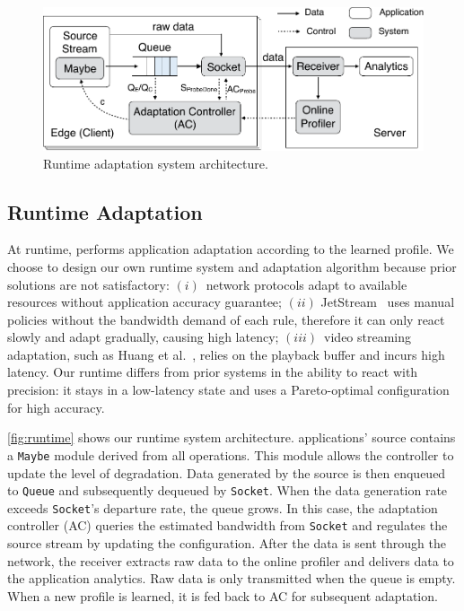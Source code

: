 \begin{figure}
  \centering
  \includegraphics[width=\linewidth]{figures/runtime-adaptation.pdf}
  \caption{Runtime adaptation system architecture.}
  \label{fig:runtime}
\end{figure}

\subsection{Runtime Adaptation}
\label{sec:runtime}

At runtime, \sysname{} performs application adaptation according to the learned
profile. We choose to design our own runtime system and adaptation algorithm
because prior solutions are not satisfactory: $(i)$~network protocols adapt to
available resources without application accuracy guarantee; $(ii)$
JetStream~\cite{rabkin2014aggregation} uses manual policies without the
bandwidth demand of each rule, therefore it can only react slowly and adapt
gradually, causing high latency; $(iii)$~video streaming adaptation, such as
Huang et al.~\cite{huang2014buffer}, relies on the playback buffer and incurs
high latency. Our runtime differs from prior systems in the ability to react
with precision: it stays in a low-latency state and uses a Pareto-optimal
configuration for high accuracy.

\autoref{fig:runtime} shows our runtime system architecture. \sysname{}
applications' source contains a \texttt{Maybe} module derived from all \maybe{}
operations. This module allows the controller to update the level of
degradation. Data generated by the source is then enqueued to \texttt{Queue} and
subsequently dequeued by \texttt{Socket}. When the data generation rate exceeds
\texttt{Socket}'s departure rate, the queue grows. In this case, the adaptation
controller (AC) queries the estimated bandwidth from \texttt{Socket} and
regulates the source stream by updating the configuration.  After the data is
sent through the network, the receiver extracts raw data to the online profiler
and delivers data to the application analytics. Raw data is only transmitted
when the queue is empty. When a new profile is learned, it is fed back to AC for
subsequent adaptation.

